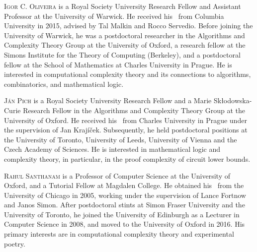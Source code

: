 \documentclass{toc}
\begin{document}
%
%
%
%
%
%
%
%
%
%
%
%
%
%
\begin{tocaboutauthors}
\begin{tocabout}[oliveira]  %
  \textsc{Igor C. Oliveira} 
is a Royal Society University Research Fellow and Assistant Professor at the University of Warwick. He received his \phd\ from Columbia University in 2015, advised by Tal Malkin and Rocco Servedio. Before joining the University of Warwick, he was a postdoctoral researcher in the Algorithms and Complexity Theory Group at the University of Oxford, a research fellow at 
%
the %
Simons Institute for the Theory of Computing (Berkeley),
%
and a postdoctoral fellow at the School of Mathematics at Charles University in Prague. He is interested in computational complexity theory and its connections to algorithms, combinatorics, and mathematical logic.
\end{tocabout}
\begin{tocabout}[pich]
\textsc{J\'an Pich} is %
a Royal Society University Research Fellow and %
a Marie Sk{\l}odowska-Curie Research Fellow
%
in   %
the Algorithms and Complexity Theory Group at the University of Oxford. He received his \phd\ from Charles University in Prague under the supervision of Jan Kraj\'i\v{c}ek. Subsequently, he held postdoctoral positions at the University of Toronto, University of Leeds, University of Vienna and the Czech Academy of Sciences. He is interested in mathematical logic and complexity theory,
%
in particular, in  %
the %
proof complexity of circuit lower bounds.

\end{tocabout}

\begin{tocabout}[santhanam]
\textsc{Rahul Santhanam} is a Professor of Computer Science at the University of Oxford, and a Tutorial Fellow at Magdalen College. He obtained his \phd\ from the University of Chicago in 2005, working under the supervision of Lance Fortnow and Janos Simon. After postdoctoral stints at Simon Fraser University and the University of Toronto, he joined the University of Edinburgh as a Lecturer in Computer Science in 2008, and moved to the University of Oxford in 2016. His primary interests are in computational complexity theory and experimental poetry.
\end{tocabout}
\end{tocaboutauthors}
\end{document}
